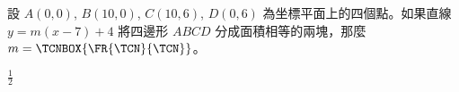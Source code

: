 \begin{QUESTIONS}
\begin{QUESTION}
        \begin{QBODY}
            設 $A(0,0)$, $B(10,0)$, $C(10,6)$, $D(0,6)$ 為坐標平面上的四個點。如果直線 $y=m(x-7)+4$ 將四邊形 $ABCD$ 分成面積相等的兩塊，那麼 $m= \TCNBOX{\FR{\TCN}{\TCN}}$。
        \end{QBODY}
        \begin{QFROMS}
        \end{QFROMS}
        \begin{QTAGS}\end{QTAGS}
        \begin{QANS}
            $ \frac{1}{2}$
        \end{QANS}
        \begin{QSOLLIST}
        \end{QSOLLIST}
        \begin{QEMPTYSPACE}
        \end{QEMPTYSPACE}
    \end{QUESTION}
\end{QUESTIONS}
